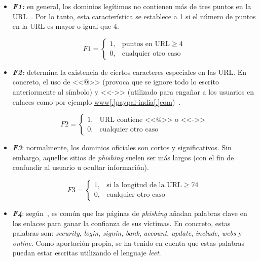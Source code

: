 \begin{itemize}
	\item \textit{\textbf{F1:}} en general, los dominios legítimos no contienen más de tres puntos en la URL~\cite{featuresPhishing2018Gupta}. Por lo tanto, esta característica se establece a 1 si el número de puntos en la URL es mayor o igual que 4.
	
	\[F1 = \left\{ \begin{array}{lr} 1, & \text{puntos en URL} \ge 4\\ 
	0, & \text{cualquier otro caso} \label{eqn:phishing_f1} \end{array} \right. \] 
	
	\item \textit{\textbf{F2:}} determina la existencia de ciertos caracteres especiales en las URL. En concreto, el uso de <<@>> (provoca que se ignore todo lo escrito anteriormente al símbolo) y <<->> (utilizado para engañar a los usuarios en enlaces como por ejemplo \url{www[.]paypal-india[.]com})~\cite{featuresPhishing2018Gupta}.
	
	\[F2 = \left\{ \begin{array}{lr} 1, & \text{URL contiene <<@>> o <<->>}\\ 
	0, & \text{cualquier otro caso} \label{eqn:phishing_f2} \end{array} \right. \]
	
	\item \textit{\textbf{F3}}: normalmente, los dominios oficiales son cortos y significativos. Sin embargo, aquellos sitios de \textit{phishing} suelen ser más largos (con el fin de confundir al usuario u ocultar información).
	
	\[F3 = \left\{ \begin{array}{lr} 1, & \text{si la longitud de la URL} \ge 74\\ 
	0, & \text{cualquier otro caso} \label{eqn:phishing_f3} \end{array} \right. \]
	
	\item \textit{\textbf{F4}}: según~\cite{featuresPhishing2018Gupta}, es común que las páginas de \textit{phishing} añadan palabras clave en los enlaces para ganar la confianza de sus víctimas. En concreto, estas palabras son: \textit{security}, \textit{login}, \textit{signin}, \textit{bank}, \textit{account}, \textit{update}, \textit{include}, \textit{webs} y \textit{online}. Como aportación propia, se ha tenido en cuenta que estas palabras puedan estar escritas utilizando el lenguaje \textit{leet}.
	

\end{itemize}
